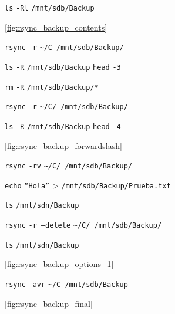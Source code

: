 \documentclass[11pt]{article}
\newcommand{\imagecaption}[1]{\vspace{-7pt}\caption*{\char91\ref{fig:#1}\char93}}
\newcommand{\codetext}[2]{\large\texttt{\textcolor{#1}{#2}}}
\begin{document}
		\begin{figure}[H]
			\centering
			\begin{code-box}
				\codetext{light-red}{ls} \codetext{light-orange}{-Rl} \codetext{light-red}{/mnt/sdb/Backup}
			\end{code-box}
			\imagecaption{rsync_backup_contents}
		\end{figure}

		\begin{figure}[H]
			\centering
			\begin{code-box}
				\codetext{light-blue}{rsync} \codetext{light-orange}{-r} \codetext{light-red}{\textasciitilde/C /mnt/sdb/Backup/}

				\codetext{light-blue}{ls} \codetext{light-orange}{-R} \codetext{light-red}{/mnt/sdb/Backup} \textbar{} \codetext{light-blue}{head} \codetext{light-orange}{-3}

				\codetext{light-blue}{rm} \codetext{light-orange}{-R} \codetext{light-red}{/mnt/sdb/Backup/*}

				\codetext{light-blue}{rsync} \codetext{light-orange}{-r} \codetext{light-red}{\textasciitilde/C/ /mnt/sdb/Backup/}

				\codetext{light-blue}{ls} \codetext{light-orange}{-R} \codetext{light-red}{/mnt/sdb/Backup} \textbar{} \codetext{light-blue}{head} \codetext{light-orange}{-4}
			\end{code-box}
			\imagecaption{rsync_backup_forwardslash}
		\end{figure}

		\begin{figure}[H]
			\centering
			\begin{code-box}
				\codetext{light-blue}{rsync} \codetext{light-orange}{-rv} \codetext{light-red}{\textasciitilde/C/ /mnt/sdb/Backup/}

				\codetext{light-blue}{echo} \codetext{light-red}{``Hola''} \textgreater{} \codetext{light-red}{/mnt/sdb/Backup/Prueba.txt}
				
				\codetext{light-blue}{ls} \codetext{light-red}{/mnt/sdn/Backup}

				\codetext{light-blue}{rsync} \codetext{light-orange}{-r --delete} \codetext{light-red}{\textasciitilde/C/ /mnt/sdb/Backup/}

				\codetext{light-blue}{ls} \codetext{light-red}{/mnt/sdn/Backup}
			\end{code-box}
			\imagecaption{rsync_backup_options_1}
		\end{figure}

		\begin{figure}[H]
			\centering
			\begin{code-box}
				\codetext{light-blue}{rsync} \codetext{light-orange}{-avr} \codetext{light-red}{\textasciitilde/C /mnt/sdb/Backup}
			\end{code-box}
			\imagecaption{rsync_backup_final}
		\end{figure}
\end{document}
